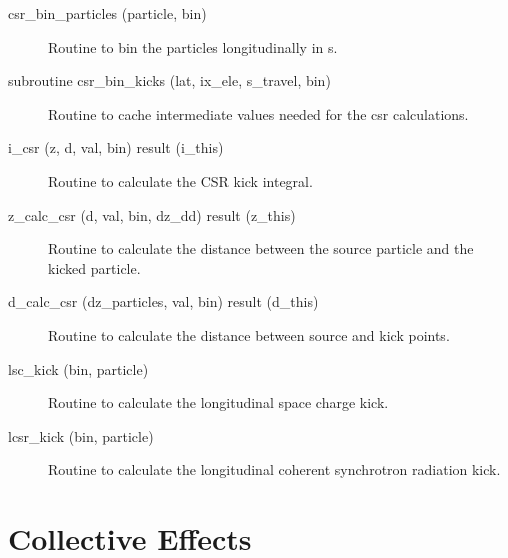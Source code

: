 \begin{description}

\item[csr_bin_particles (particle, bin)] \Newline 
Routine to bin the particles longitudinally in s. 

\item[subroutine csr_bin_kicks (lat, ix_ele, s_travel, bin)] \Newline 
Routine to cache intermediate values needed for the csr calculations.

\item[i_csr (z, d, val, bin) result (i_this)] \Newline 
Routine to calculate the CSR kick integral.

\item[z_calc_csr (d, val, bin, dz_dd) result (z_this)] \Newline 
Routine to calculate the distance between the source particle and the
kicked particle.

\item[d_calc_csr (dz_particles, val, bin) result (d_this)] \Newline 
Routine to calculate the distance between source and kick points.

\item[lsc_kick (bin, particle)] \Newline 
Routine to calculate the longitudinal space charge kick.

\item[lcsr_kick (bin, particle)] \Newline 
Routine to calculate the longitudinal coherent synchrotron radiation kick.

\end{description}

\section{Collective Effects}
\label{r:collective}

